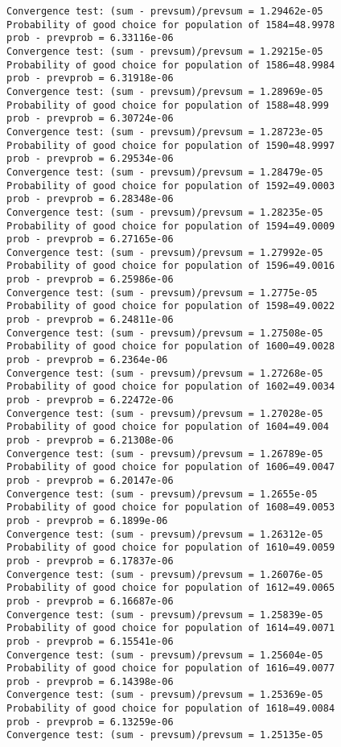\documentclass[11pt,onecolumn]{article}
\begin{document}
\begin{verbatim}
Convergence test: (sum - prevsum)/prevsum = 1.29462e-05
Probability of good choice for population of 1584=48.9978
prob - prevprob = 6.33116e-06
Convergence test: (sum - prevsum)/prevsum = 1.29215e-05
Probability of good choice for population of 1586=48.9984
prob - prevprob = 6.31918e-06
Convergence test: (sum - prevsum)/prevsum = 1.28969e-05
Probability of good choice for population of 1588=48.999
prob - prevprob = 6.30724e-06
Convergence test: (sum - prevsum)/prevsum = 1.28723e-05
Probability of good choice for population of 1590=48.9997
prob - prevprob = 6.29534e-06
Convergence test: (sum - prevsum)/prevsum = 1.28479e-05
Probability of good choice for population of 1592=49.0003
prob - prevprob = 6.28348e-06
Convergence test: (sum - prevsum)/prevsum = 1.28235e-05
Probability of good choice for population of 1594=49.0009
prob - prevprob = 6.27165e-06
Convergence test: (sum - prevsum)/prevsum = 1.27992e-05
Probability of good choice for population of 1596=49.0016
prob - prevprob = 6.25986e-06
Convergence test: (sum - prevsum)/prevsum = 1.2775e-05
Probability of good choice for population of 1598=49.0022
prob - prevprob = 6.24811e-06
Convergence test: (sum - prevsum)/prevsum = 1.27508e-05
Probability of good choice for population of 1600=49.0028
prob - prevprob = 6.2364e-06
Convergence test: (sum - prevsum)/prevsum = 1.27268e-05
Probability of good choice for population of 1602=49.0034
prob - prevprob = 6.22472e-06
Convergence test: (sum - prevsum)/prevsum = 1.27028e-05
Probability of good choice for population of 1604=49.004
prob - prevprob = 6.21308e-06
Convergence test: (sum - prevsum)/prevsum = 1.26789e-05
Probability of good choice for population of 1606=49.0047
prob - prevprob = 6.20147e-06
Convergence test: (sum - prevsum)/prevsum = 1.2655e-05
Probability of good choice for population of 1608=49.0053
prob - prevprob = 6.1899e-06
Convergence test: (sum - prevsum)/prevsum = 1.26312e-05
Probability of good choice for population of 1610=49.0059
prob - prevprob = 6.17837e-06
Convergence test: (sum - prevsum)/prevsum = 1.26076e-05
Probability of good choice for population of 1612=49.0065
prob - prevprob = 6.16687e-06
Convergence test: (sum - prevsum)/prevsum = 1.25839e-05
Probability of good choice for population of 1614=49.0071
prob - prevprob = 6.15541e-06
Convergence test: (sum - prevsum)/prevsum = 1.25604e-05
Probability of good choice for population of 1616=49.0077
prob - prevprob = 6.14398e-06
Convergence test: (sum - prevsum)/prevsum = 1.25369e-05
Probability of good choice for population of 1618=49.0084
prob - prevprob = 6.13259e-06
Convergence test: (sum - prevsum)/prevsum = 1.25135e-05

\end{verbatim}
\end{document}
